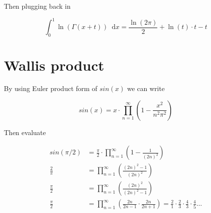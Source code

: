 \documentclass{article}
\newcommand*\diff{\mathop{}\!\mathrm{d}}
\begin{document}
Then plugging back in

\begin{equation}
    \int^1_0 \ln\left(\Gamma(x + t)\right) \diff x = \frac{\ln(2\pi)}{2} + \ln(t) \cdot t -t 
\end{equation}

\section{Wallis product}

By using Euler product form of $sin(x)$ we can write

\begin{equation}
    sin(x) = x\cdot \prod^{\infty}_{n=1} \left( 1 - \frac{x^2}{n^2 \pi^2} \right) 
\end{equation}

Then evaluate 

\begin{equation}
\begin{split}
    sin(\pi / 2) &= \frac{\pi}{2} \cdot \prod^{\infty}_{n=1}\left( 1 - \frac{1}{(2n)^2} \right) \\
    \frac{2}{\pi} &= \prod^{\infty}_{n=1}\left( \frac{(2n)^2 - 1}{(2n)^2}  \right) \\
    \frac{\pi}{2} &= \prod^{\infty}_{n=1} \left( \frac{(2n)^2}{(2n)^2 - 1} \right) \\
    \frac{\pi}{2} &= \prod^{\infty}_{n=1} \left( \frac{2n}{2n - 1} \cdot \frac{2n}{2n + 1} \right) = \frac{2}{1} \cdot \frac{2}{3} \cdot \frac{4}{3} \cdot \frac{4}{5} \dots
\end{split}
\end{equation}
\end{document}
